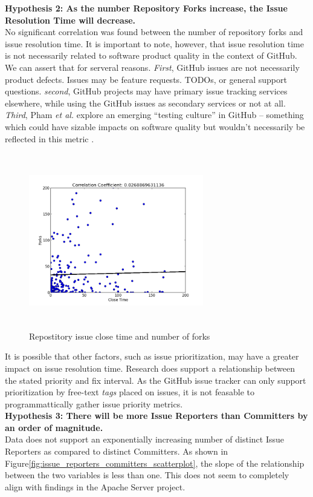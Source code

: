 \documentclass{proc}
\begin{document}
{{{{{{{\textbf{Hypothesis 2: As the number Repository Forks increase, the Issue Resolution Time will decrease.}\\
No significant correlation was found between the number of repository forks and issue resolution time. It is important to note, however, that issue resolution time is not necessarily related to software product quality in the context of GitHub. We can assert that for serveral reasons. \textit{First}, GitHub issues are not necessarily product defects. Issues may be feature requests. TODOs, or general support questions. \textit{second}, GitHub projects may have primary issue tracking services elsewhere, while using the GitHub issues as secondary services or not at all. \textit{Third}, Pham \textit{et al.} explore an emerging ``testing culture'' in GitHub -- something which could have sizable impacts on software quality but wouldn't necessarily be reflected in this metric \cite{phamcreating}.

\begin{figure}
\includegraphics[height=3in,width=3in]{images/issue_close_time_forks_scatterplot.png}
\caption{Repostitory issue close time and number of forks}
\label{fig:issue_close_time_forks_scatterplot}
\end{figure}

It is possible that other factors, such as issue prioritization, may have a greater impact on issue resolution time. Research does support a relationship\cite{mockus2002two} between the stated priority and fix interval. As the GitHub issue tracker can only support prioritization by free-text \textit{tags} placed on issues, it is not feasable to programmattically gather issue priority metrics.\\

\textbf{Hypothesis 3: There will be more Issue Reporters than Committers by an order of magnitude.}\\
Data does not support an exponentially increasing number of distinct Issue Reporters as compared to distinct Committers. 
As shown in Figure\ref{fig:issue_reporters_committers_scatterplot}, the slope of the relationship between the two variables is less than one. This does not seem to completely align with findings in the Apache Server project\cite{mockus2000case}. 

}}}}}}}
\end{document}
